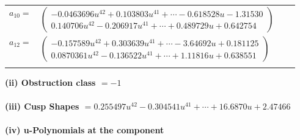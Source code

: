 \documentclass[1p]{elsarticle_modified}
\theoremstyle{definition}
\begin{document}
\begin{tabular}{m{7pt} m{180pt} m{7pt} m{180pt} }
\flushright $a_{10}=$&$\begin{pmatrix}-0.0463696 u^{42}+0.103803 u^{41}+\cdots-0.618528 u-1.31530\\0.140706 u^{42}-0.206917 u^{41}+\cdots+0.489729 u+0.642754\end{pmatrix}$ \\
\flushright $a_{12}=$&$\begin{pmatrix}-0.157589 u^{42}+0.303639 u^{41}+\cdots-3.64692 u+0.181125\\0.0870361 u^{42}-0.136522 u^{41}+\cdots+1.11816 u+0.638551\end{pmatrix}$\\&\end{tabular}
\flushleft \textbf{(ii) Obstruction class $= -1$}\\~\\
\flushleft \textbf{(iii) Cusp Shapes $= 0.255497 u^{42}-0.304541 u^{41}+\cdots+16.6870 u+2.47466$}\\~\\
\newpage\renewcommand{\arraystretch}{1}
\flushleft \textbf{(iv) u-Polynomials at the component}\newline \\
\end{document}
